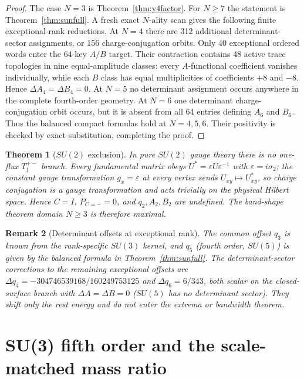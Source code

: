 \documentclass[11pt]{article}
\newtheorem{theorem}{Theorem}[section]
\newtheorem{remark}[theorem]{Remark}
\begin{document}
\begin{proof}
The case $N=3$ is Theorem~\ref{thm:y4factor}. For $N\geq7$ the statement is
Theorem~\ref{thm:sunfull}. A fresh exact $N$-ality scan gives the following
finite exceptional-rank reductions. At $N=4$ there are 312 additional
determinant-sector assignments, or 156 charge-conjugation orbits. Only 40
exceptional ordered words enter the 64-key $A/B$ target. Their contraction
contains 48 active trace topologies in nine equal-amplitude classes: every
$A$-functional coefficient vanishes individually, while each $B$ class has
equal multiplicities of coefficients $+8$ and $-8$. Hence
$\Delta A_4=\Delta B_4=0$. At $N=5$ no determinant assignment occurs anywhere
in the complete fourth-order geometry. At $N=6$ one determinant
charge-conjugation orbit occurs, but it is absent from all 64 entries defining
$A_6$ and $B_6$. Thus the balanced compact formulas hold at $N=4,5,6$.
Their positivity is checked by exact substitution, completing the proof.
\end{proof}

\begin{theorem}[$SU(2)$ exclusion]\label{thm:su2excl}
In pure $SU(2)$ gauge theory there is no one-flux $T_1^{+-}$ branch. Every
fundamental matrix obeys $U^*=\varepsilon U\varepsilon^{-1}$ with
$\varepsilon=i\sigma_2$; the constant gauge transformation $g_x=\varepsilon$ at
every vertex sends $U_{xy}\mapsto U_{xy}^*$, so charge conjugation is a gauge
transformation and acts trivially on the physical Hilbert space. Hence $C=I$,
$P_{C=-}=0$, and $q_2,A_2,B_2$ are undefined. The band-shape theorem domain
$N\geq3$ is therefore maximal.
\end{theorem}

\begin{remark}[Determinant offsets at exceptional rank]
The common offset $q_3$ is known from the rank-specific $SU(3)$ kernel, and $q_5$
(fourth order, $SU(5)$) is given by the balanced formula in
Theorem~\ref{thm:sunfull}. The determinant-sector corrections to the remaining
exceptional offsets are $\Delta q_4=-304746539168/160249753125$ and
$\Delta q_6=6/343$, both scalar on the closed-surface branch with
$\Delta A=\Delta B=0$ ($SU(5)$ has no determinant sector). They shift only the
rest energy and do not enter the extrema or bandwidth theorem.
\end{remark}

\section{SU(3) fifth order and the scale-matched mass ratio}
\label{sec:fifth}
\end{document}
